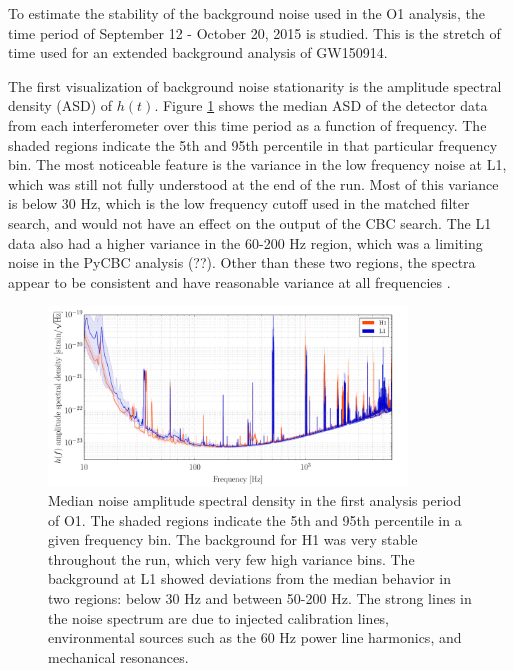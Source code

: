 To estimate the stability of the background noise used in the O1
analysis, the time period of September 12 - October 20, 2015 is
studied. This is the stretch
of time used for an extended background analysis of GW150914.

The first
visualization of background noise stationarity is the amplitude
spectral density (ASD) of $h(t)$. Figure \ref{fig:median-asd}
shows the
median ASD of the detector data from each interferometer over this
time period as a function of frequency. The shaded regions indicate
the 5th and 95th percentile in that particular frequency bin.
The most noticeable feature is the variance in the low frequency
noise at L1, which was still not fully understood at the end of the run.
Most of this variance is below 30 Hz, which is the
low frequency cutoff used in the matched filter search, and would
not have an effect on the output of the CBC search. The L1 data
also had a higher variance in the 60-200 Hz region, which was a
limiting noise in the PyCBC analysis (??). Other than these two regions,
the spectra appear to be consistent and have reasonable variance
at all frequencies \cite{GW150914-DETCHAR}.

\begin{figure}[ht!]%
\includegraphics[width=0.85\textwidth]{figures/O1/H1L1-OBSERVING_GW150914_PERCENTILE_SPECTRUM-1126073342-3309798}
\caption[Median noise ASD in O1]{Median noise amplitude spectral density %
         in the first analysis period of O1. The shaded regions indicate %
         the 5th and 95th percentile in a given frequency bin. The background %
         for H1 was very stable throughout the run, which very few high %
         variance bins. The background at L1 showed deviations from the %
         median behavior in two regions: below 30 Hz and between 50-200 Hz. %
         The strong lines in the noise spectrum are due to injected calibration %
         lines, environmental sources such as the 60 Hz power line harmonics, %
         and mechanical resonances.
         }
\label{fig:median-asd}
\end{figure}

